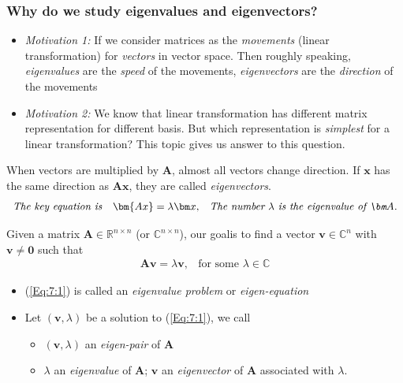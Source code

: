 \subsubsection{Why do we study eigenvalues and eigenvectors?}
\begin{itemize}
\item
\emph{Motivation 1: }If we consider matrices as the \textit{movements} (linear transformation) for \textit{vectors} in vector space. Then roughly speaking, \textit{eigenvalues} are the \textit{speed} of the movements, \textit{eigenvectors} are the \textit{direction} of the movements
\item
\emph{Motivation 2: }We know that linear transformation has different matrix representation for different basis. But which representation is \emph{simplest} for a linear transformation? This topic gives us answer to this question.
\end{itemize}
When vectors are multiplied by $\bm A$, almost all vectors change direction. If $\bm x$ has the same direction as $\bm{Ax}$, they are called \emph{eigenvectors}.
\[
\begin{array}{lll}
\mbox{\emph{The key equation is}}
&
\bm{Ax}=\lambda\bm x,
&
\emph{The number $\lambda$ is the eigenvalue of $\bm A$.}
\end{array}
\]
\begin{definition}
Given a matrix $\bm A\in\mathbb{R}^{n\times n}$ (or $\mathbb{C}^{n\times n}$), our goalis to find a vector $\bm v\in\mathbb{C}^n$ with $\bm v\ne\bm 0$ such that
\begin{equation}\label{Eq:7:1}
\begin{array}{ll}
\bm A\bm v=\lambda\bm v,
&
\mbox{for some $\lambda\in\mathbb{C}$}
\end{array}
\end{equation}
\begin{itemize}
\item
(\ref{Eq:7:1}) is called an \emph{eigenvalue problem} or \emph{eigen-equation}
\item
Let $(\bm v,\lambda)$ be a solution to (\ref{Eq:7:1}), we call
\begin{itemize}
\item
$(\bm v,\lambda)$ an \emph{eigen-pair} of $\bm A$
\item
$\lambda$ an \emph{eigenvalue} of $\bm A$; $\bm v$ an \emph{eigenvector} of $\bm A$ associated with $\lambda$.
\end{itemize}
\end{itemize}
\end{definition}
